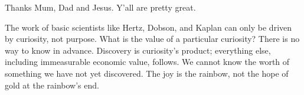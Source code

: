 
\begin{acknowledgements}      


Thanks Mum, Dad and Jesus. Y'all are pretty great.

The work of basic scientists like Hertz, Dobson, and Kaplan can only be driven by curiosity, not purpose. What is the value of a particular curiosity? There is no way to know in advance. Discovery is curiosity’s product; everything else, including immeasurable economic value, follows. We cannot know the worth of something we have not yet discovered. The joy is the rainbow, not the hope of gold at the rainbow’s end.

\end{acknowledgements}
